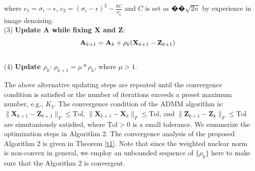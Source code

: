 \documentclass[10pt,twocolumn,letterpaper,sort&compress]{article}
\begin{document}
where $c_{1}=\sigma_{i}-\epsilon$, $c_{2} = (\sigma_{i}-\epsilon)^{2}-\frac{8C}{\rho_{k}}$ and $C$ is set as $��
\sqrt{2n}$ by experience in image denoising.
 \\
(3) \textbf{Update $\mathbf{A}$ while fixing $\mathbf{X}$ and $\mathbf{Z}$}:
\vspace{-3mm}
\begin{equation}
\label{e18}
\vspace{-7mm}
\mathbf{A}_{k+1}
=
\mathbf{A}_{k} + \rho_{k}(\mathbf{X}_{k+1}-\mathbf{Z}_{k+1})
\end{equation}
\\
(4) \textbf{Update $\rho_{k}$}: $\rho_{k+1}= \mu * \rho_{k}$, where $\mu>1$.

The above alternative updating steps are repeated until the convergence condition is satisfied or the number of iterations exceeds a preset maximum number, e.g., $K_{2}$. The convergence condition of the ADMM algorithm is: $\|\mathbf{X}_{k+1}-\mathbf{Z}_{k+1}\|_{F}\le \text{Tol}$, $\|\mathbf{X}_{k+1}-\mathbf{X}_{k}\|_{F}\le \text{Tol}$, and $\|\mathbf{Z}_{k+1}-\mathbf{Z}_{k}\|_{F}\le \text{Tol}$ are simutaniously satisfied, where $\text{Tol}>0$ is a small tolerance. We summerize the optimization steps in Algorithm 2. The convergence analysis of the proposed Algorithm 2 is given in Theorem \ref{t1}. Note that since the weighted nuclear norm is non-convex in general, we employ an unbounded sequence of $\{\rho_{k}\}$ here to make sure that the Algorithm 2 is convergent. 
\end{document}
